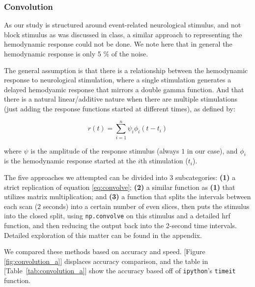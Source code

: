 \subsubsection{Convolution}
\par \indent As our study is structured around event-related neurological 
stimulus, and not block stimulus as was discussed in class, a similar 
approach to representing the hemodynamic response could not be done. 
We note here that in general the hemodynamic response is only 5 \% of 
the noise.

The general assumption is that there is a relationship between the 
hemodynamic response to neurological stimulation, where a single 
stimulation generates a delayed hemodyamic response that mirrors 
a double gamma function. And that there is a natural linear/additive 
nature when there are multiple stimulations (just adding the response 
functions started at different times), as defined by:

\begin{equation} \label{eq:convolve}
r(t)= \sum_{i=1}^n \psi_{i} \phi_{i}(t-t_i)
\end{equation}

where $\psi$ is the amplitude of the response stimulus (always $1$ in our 
case), and $\phi_{i}$ is the hemodynamic response started at the $i$th 
stimulation ($t_i$).

The five approaches we attempted can be divided into 3 subcategories: 
\textbf{(1)} a strict replication of equation \ref{eq:convolve}; \textbf{(2)} a similar 
function as \textbf{(1)} that utilizes matrix multiplication; and \textbf{(3)} a 
function that splits the intervals between each scan (2 seconds) into a certain 
number of even slices, then puts the stimulus into the closed split, using 
\texttt{np.convolve} on this stimulus and a detailed hrf function, and then 
reducing the output back into the 2-second time intervals. Detailed exploration 
of this matter can be found in the appendix.

We compared these methods based on accuracy and speed. [Figure 
\ref{fig:convolution_a}] displaces accuracy comparison, and the table in 
[Table~\ref{tab:convolution_a}] show the accuracy based off of \texttt{ipython}'s 
\texttt{timeit} function.



